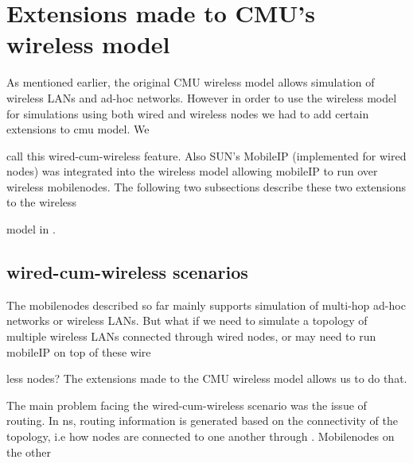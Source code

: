 {\section{Extensions made to CMU's wireless model}
\label{sec:wireless-extensions}

As mentioned earlier, the original CMU wireless model allows simulation of wireless LANs and ad-hoc networks. However in order to use the wireless model for simulations using both wired and wireless nodes we had to add certain extensions to cmu model. We 











call this wired-cum-wireless feature. Also SUN's MobileIP (implemented for wired nodes) was integrated into the wireless model allowing mobileIP to run over wireless mobilenodes. The following two subsections describe these two extensions to the wireless 











model in \ns. 


\subsection{wired-cum-wireless scenarios}
\label{sec:wired-cum-wireless}

The mobilenodes described so far mainly supports simulation of multi-hop ad-hoc networks or wireless LANs. But what if we need to simulate a topology of multiple wireless LANs connected through wired nodes, or may need to run mobileIP on top of these wire











less nodes? The extensions made to the CMU wireless model allows us to do that.

The main problem facing the wired-cum-wireless scenario was the issue of routing. In ns, routing information is generated based on the connectivity of the topology, i.e how nodes are connected to one another through . Mobilenodes on the other 











}
